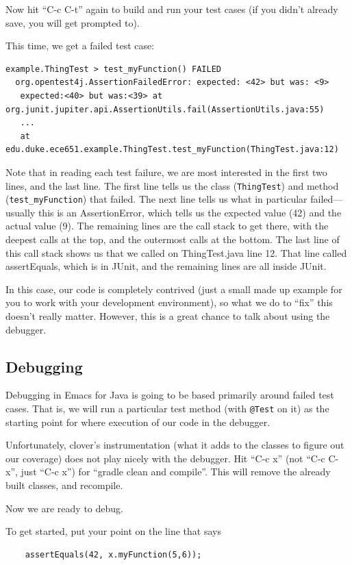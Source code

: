 \documentclass[12pt]{article}
\begin{document}
Now hit ``C-c C-t'' again to build and run your test cases (if you didn't already save, you will get prompted to).

This time, we get a failed test case:
\begin{verbatim}
example.ThingTest > test_myFunction() FAILED 
  org.opentest4j.AssertionFailedError: expected: <42> but was: <9>
   expected:<40> but was:<39> at org.junit.jupiter.api.AssertionUtils.fail(AssertionUtils.java:55) 
   ...   
   at edu.duke.ece651.example.ThingTest.test_myFunction(ThingTest.java:12)
\end{verbatim}

Note that in reading each test failure, we are most interested in the
first two lines, and the last line.  The first line tells us the class
(\verb+ThingTest+) and method (\verb+test_myFunction+) that failed.  The
next line tells us what in particular failed---usually this is an
AssertionError, which tells us the expected value (42) and the actual
value (9).  The remaining lines are the call stack to get there, with
the deepest calls at the top, and the outermost calls at the bottom.
The last line of this call stack shows us that we called on
ThingTest.java line 12.  That line called assertEquals, which is in
JUnit, and the remaining lines are all inside JUnit.

In this case, our code is completely contrived (just a small made up
example for you to work with your development environment), so what
we do to ``fix'' this doesn't really matter.  However, this
is a great chance to talk about using the debugger.


\subsection{Debugging}
Debugging in Emacs for Java is going to be based primarily around
failed test cases.  That is, we will run a particular test method
(with \verb+@Test+ on it) as the starting point for where execution
of our code in the debugger.

Unfortunately, clover's instrumentation (what it adds to the classes
to figure out our coverage) does not play nicely with the debugger.
Hit ``C-c x'' (not ``C-c C-x'', just ``C-c x'') for ``gradle clean and
compile''.  This will  remove the already built classes, and recompile.

Now we are ready to debug.

To get started, put your point on the line that says
\begin{verbatim}
    assertEquals(42, x.myFunction(5,6)); 
\end{verbatim}
\end{document}
